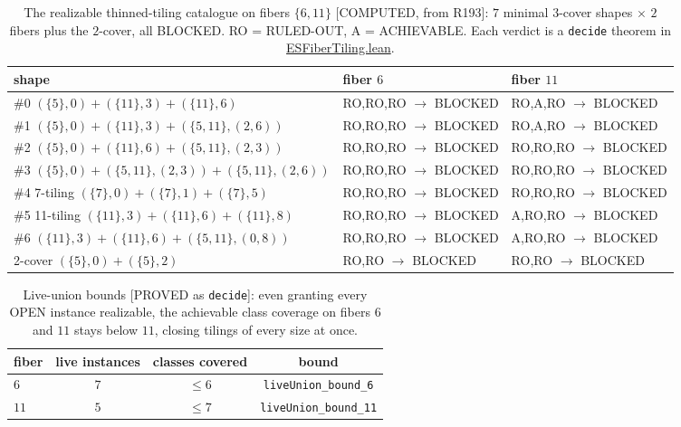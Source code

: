 \documentclass[11pt,a4paper]{article}
\theoremstyle{definition}
\begin{document}
\begin{table}[t]
  \centering
  \caption{The realizable thinned-tiling catalogue on fibers
    $\{6,11\}$ [COMPUTED, from R193]: $7$ minimal $3$-cover shapes
    $\times$ $2$ fibers plus the $2$-cover, all BLOCKED. RO =
    RULED-OUT, A = ACHIEVABLE. Each verdict is a \texttt{decide}
    theorem in \url{ESFiberTiling.lean}.}
  \label{tab:catalogue}
  \begin{tabular}{lll}
    \toprule
    shape & fiber $6$ & fiber $11$ \\
    \midrule
    \#0 $(\{5\},0)+(\{11\},3)+(\{11\},6)$ & RO,RO,RO $\to$ BLOCKED & RO,A,RO $\to$ BLOCKED \\
    \#1 $(\{5\},0)+(\{11\},3)+(\{5,11\},(2,6))$ & RO,RO,RO $\to$ BLOCKED & RO,A,RO $\to$ BLOCKED \\
    \#2 $(\{5\},0)+(\{11\},6)+(\{5,11\},(2,3))$ & RO,RO,RO $\to$ BLOCKED & RO,RO,RO $\to$ BLOCKED \\
    \#3 $(\{5\},0)+(\{5,11\},(2,3))+(\{5,11\},(2,6))$ & RO,RO,RO $\to$ BLOCKED & RO,RO,RO $\to$ BLOCKED \\
    \#4 7-tiling $(\{7\},0)+(\{7\},1)+(\{7\},5)$ & RO,RO,RO $\to$ BLOCKED & RO,RO,RO $\to$ BLOCKED \\
    \#5 11-tiling $(\{11\},3)+(\{11\},6)+(\{11\},8)$ & RO,RO,RO $\to$ BLOCKED & A,RO,RO $\to$ BLOCKED \\
    \#6 $(\{11\},3)+(\{11\},6)+(\{5,11\},(0,8))$ & RO,RO,RO $\to$ BLOCKED & A,RO,RO $\to$ BLOCKED \\
    2-cover $(\{5\},0)+(\{5\},2)$ & RO,RO $\to$ BLOCKED & RO,RO $\to$ BLOCKED \\
    \bottomrule
  \end{tabular}
\end{table}

\begin{table}[t]
  \centering
  \caption{Live-union bounds [PROVED as \texttt{decide}]: even granting
    every OPEN instance realizable, the achievable class coverage on
    fibers $6$ and $11$ stays below $11$, closing tilings of every size
    at once.}
  \label{tab:bounds}
  \begin{tabular}{lccc}
    \toprule
    fiber & live instances & classes covered & bound \\
    \midrule
    $6$ & $7$ & $\le 6$ & \texttt{liveUnion\_bound\_6} \\
    $11$ & $5$ & $\le 7$ & \texttt{liveUnion\_bound\_11} \\
    \bottomrule
  \end{tabular}
\end{table}
\end{document}
